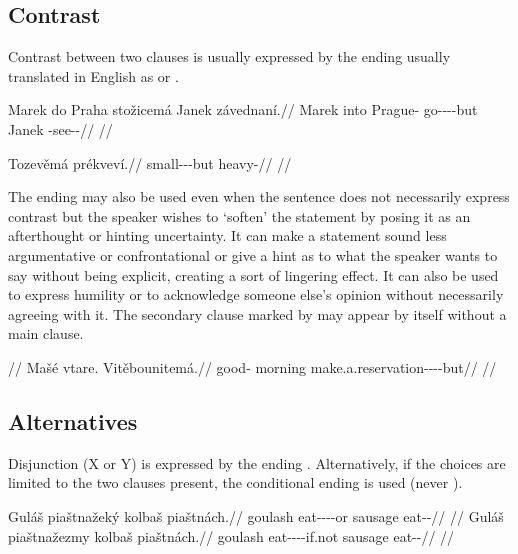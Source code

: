 \subsection{Contrast}
\label{sec:contrast}

Contrast between two clauses is usually expressed by the ending 
usually translated in English as  or .

\pex
\begingl
  \gla Marek do Praha stožicemá Janek závednaní.//
  \glb Marek into Prague-\Acc{} go-\Av{}-\Pf{}-\Cnj{}-but Janek \Neg{}-see-\Pv{}-\Ret{}//
  \glft {}//
\endgl
\xe

\pex
\begingl
  \gla Tozevěmá prékveví.//
  \glb small-\Cont{}-\Cnj{}-but heavy-\Cont{}//
  \glft {}//
\endgl
\xe

The ending  may also be used even when the sentence does not
necessarily express contrast but the speaker wishes to `soften' the statement by
posing it as an afterthought or hinting uncertainty. It can make a statement
sound less argumentative or confrontational or give a hint as to what the
speaker wants to say without being explicit, creating a sort of lingering
effect. It can also be used to express humility or to acknowledge someone else's
opinion without necessarily agreeing with it. The secondary clause marked by
 may appear by itself without a main clause.

\pex
\begingl
  \glpreamble {}//
  \gla Mašé vtare. Vitěbounitemá.//
  \glb good-\Att{} morning make.a.reservation-\Lv{}-\SupP{}-\Cnj{}-but//
  \glft {}//
\endgl
\xe


\subsection{Alternatives}
\label{sec:conj-alternatives}

Disjunction (X or Y) is expressed by the ending . Alternatively,
if the choices are limited to the two clauses present, the conditional ending
 is used (never ).

\pex
\a\begingl
  \gla Guláš piaštnažeký kolbaš piaštnách.//
  \glb goulash eat-\Pv{}-\Ctp{}-\Cnj{}-or sausage eat-\Pv{}-\Ctp{}//
  \glft {}//
\endgl
\a\begingl
  \gla Guláš piaštnažezmy kolbaš piaštnách.//
  \glb goulash eat-\Pv{}-\Ctp{}-\Cnj{}-if.not sausage eat-\Pv{}-\Ctp{}//
  \glft {}//
\endgl
\xe

